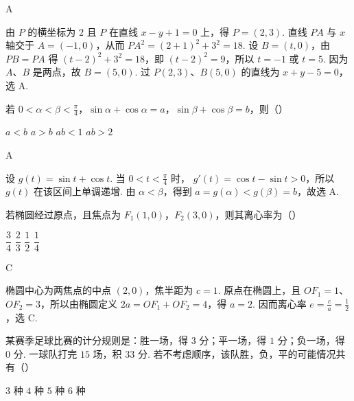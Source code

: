 \begin{answer}
A
\end{answer}

\begin{solution}
由 \(P\) 的横坐标为 \(2\) 且 \(P\) 在直线 \(x-y+1=0\) 上，得 \(P=(2,3)\). 直线 \(PA\) 与 \(x\) 轴交于 \(A=(-1,0)\)，从而
\(PA^2=(2+1)^2+3^2=18\). 设 \(B=(t,0)\)，由 \(PB=PA\) 得
\((t-2)^2+3^2=18\)，即 \((t-2)^2=9\)，所以 \(t=-1\) 或 \(t=5\). 因为 \(A\)、\(B\) 是两点，故 \(B=(5,0)\). 过 \(P(2,3)\)、\(B(5,0)\) 的直线为 \(x+y-5=0\)，选 A.
\end{solution}

\begin{problem}
若 \(0 < \alpha < \beta < \frac{\pi}{4}\)，\(\sin \alpha + \cos \alpha = a\)，\(\sin \beta + \cos \beta = b\)，则（\quad）

\choices
    {\(a < b\)}
    {\(a > b\)}
    {\(ab < 1\)}
    {\(ab > 2\)}
\end{problem}

\begin{answer}
A
\end{answer}

\begin{solution}
设 \(g(t)=\sin t+\cos t\). 当 \(0<t<\frac\pi4\) 时，
\(g'(t)=\cos t-\sin t>0\)，所以 \(g(t)\) 在该区间上单调递增. 由 \(\alpha<\beta\)，得到
\(a=g(\alpha)<g(\beta)=b\)，故选 A.
\end{solution}

\begin{problem}
若椭圆经过原点，且焦点为 \(F_1(1,0)\)，\(F_2(3,0)\)，则其离心率为（\quad）

\choices
    {\(\dfrac{3}{4}\)}
    {\(\dfrac{2}{3}\)}
    {\(\dfrac{1}{2}\)}
    {\(\dfrac{1}{4}\)}
\end{problem}

\begin{answer}
C
\end{answer}

\begin{solution}
椭圆中心为两焦点的中点 \((2,0)\)，焦半距为 \(c=1\). 原点在椭圆上，且
\(OF_1=1\)、\(OF_2=3\)，所以由椭圆定义 \(2a=OF_1+OF_2=4\)，得 \(a=2\). 因而离心率
\(e=\frac ca=\frac12\)，选 C.
\end{solution}

\begin{problem}
某赛季足球比赛的计分规则是：胜一场，得 \(3\) 分；平一场，得 \(1\) 分；负一场，得 \(0\) 分. 一球队打完 \(15\) 场，积 \(33\) 分. 若不考虑顺序，该队胜，负，平的可能情况共有（\quad）

\choices
    {\(3\) 种}
    {\(4\) 种}
    {\(5\) 种}
    {\(6\) 种}
\end{problem}

